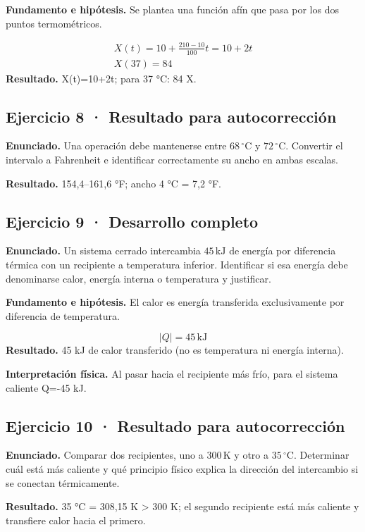 \documentclass[11pt,a4paper]{article}
\begin{document}
\textbf{Fundamento e hipótesis.} Se plantea una función afín que pasa por los dos puntos termométricos.

\[
\begin{gathered}
X(t)=10+\frac{210-10}{100}t=10+2t\\X(37)=84
\end{gathered}
\]
\textbf{Resultado.} X(t)=10+2t; para 37 °C: 84 X.


\subsection*{Ejercicio 8 · Resultado para autocorrección}
\textbf{Enunciado.} Una operación debe mantenerse entre \(68\,^\circ\mathrm C\) y \(72\,^\circ\mathrm C\). Convertir el intervalo a Fahrenheit e identificar correctamente su ancho en ambas escalas.

\textbf{Resultado.} 154,4–161,6 °F; ancho 4 °C = 7,2 °F.


\subsection*{Ejercicio 9 · Desarrollo completo}
\textbf{Enunciado.} Un sistema cerrado intercambia \(45\,\mathrm{kJ}\) de energía por diferencia térmica con un recipiente a temperatura inferior. Identificar si esa energía debe denominarse calor, energía interna o temperatura y justificar.

\textbf{Fundamento e hipótesis.} El calor es energía transferida exclusivamente por diferencia de temperatura.

\[
|Q|=45\,\mathrm{kJ}
\]
\textbf{Resultado.} 45 kJ de calor transferido (no es temperatura ni energía interna).

\textbf{Interpretación física.} Al pasar hacia el recipiente más frío, para el sistema caliente Q=-45 kJ.


\subsection*{Ejercicio 10 · Resultado para autocorrección}
\textbf{Enunciado.} Comparar dos recipientes, uno a \(300\,\mathrm K\) y otro a \(35\,^\circ\mathrm C\). Determinar cuál está más caliente y qué principio físico explica la dirección del intercambio si se conectan térmicamente.

\textbf{Resultado.} 35 °C = 308,15 K > 300 K; el segundo recipiente está más caliente y transfiere calor hacia el primero.


\clearpage
\end{document}
